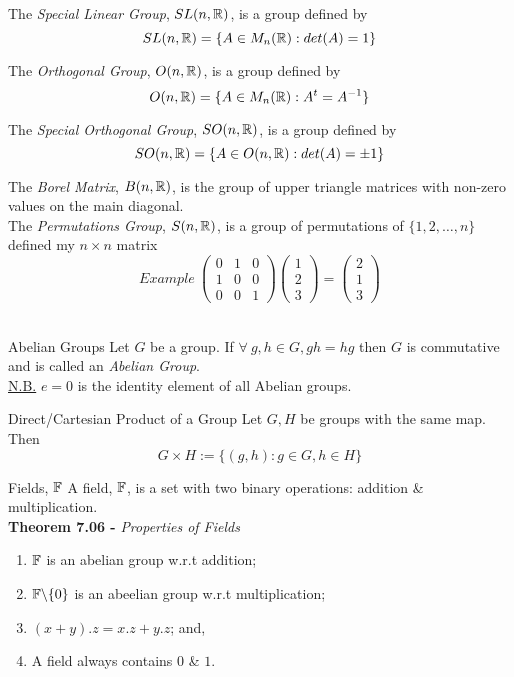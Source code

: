 \documentclass[11pt,a4paper]{article}
\begin{document}
The \textit{Special Linear Group}, $SL(n, \mathbb{R})$, is a group defined by $$SL(n ,\mathbb{R}) = \{A \in M_n(\mathbb{R}) : det(A) = 1\}$$

The \textit{Orthogonal Group}, $O(n, \mathbb{R})$, is a group defined by $$O(n ,\mathbb{R}) = \{A \in M_n(\mathbb{R}) : A^t = A^{-1}\}$$

The \textit{Special Orthogonal Group}, $SO(n, \mathbb{R})$, is a group defined by $$SO(n ,\mathbb{R}) = \{A \in O(n, \mathbb{R}) : det(A) = \pm 1\}$$

The \textit{Borel Matrix}, $B(n, \mathbb{R})$, is the group of upper triangle matrices with non-zero values on the main diagonal.\\

The \textit{Permutations Group}, $S(n, \mathbb{R})$, is a group of permutations of $\{1, 2, \dots, n\}$ defined my $n \times n$ matrix
$$\mathrm{\textit{Example}\ }\begin{pmatrix} 0 & 1 & 0 \\ 1 & 0 & 0 \\ 0 & 0 & 1 \end{pmatrix} \begin{pmatrix}1 \\ 2 \\3 \end{pmatrix} = \begin{pmatrix}2 \\ 1 \\ 3 \end{pmatrix}$$\

\subtitle{Theorem 7.03 - }{Abelian Groups}
Let $G$ be a group. If $\forall\ g, h \in G, gh = hg$ then $G$ is commutative and is called an \textit{Abelian Group}.\\
\underline{N.B.} $e = 0$ is the identity element of all Abelian groups.\\

\subtitle{Definition 7.04 - }{Direct/Cartesian Product of a Group}
Let $G, H$ be groups with the same map. Then $$G \times H := \{(g, h) : g \in G, h \in H\}$$

\subtitle{Definition 7.05 - }{Fields, $\mathbb{F}$}
A field, $\mathbb{F}$, is a set with two binary operations: addition \& multiplication.\\

\textbf{Theorem 7.06 - }\textit{Properties of Fields}
\begin{enumerate}[label=\roman*)]
  \item $\mathbb{F}$ is an abelian group w.r.t addition;
  \item $\mathbb{F} \backslash \{0\}$  is an abeelian group w.r.t multiplication;
  \item $(x + y) . z = x.z + y.z$; and,
  \item A field always contains $0$ \& $1$.
\end{enumerate}
\end{document}

